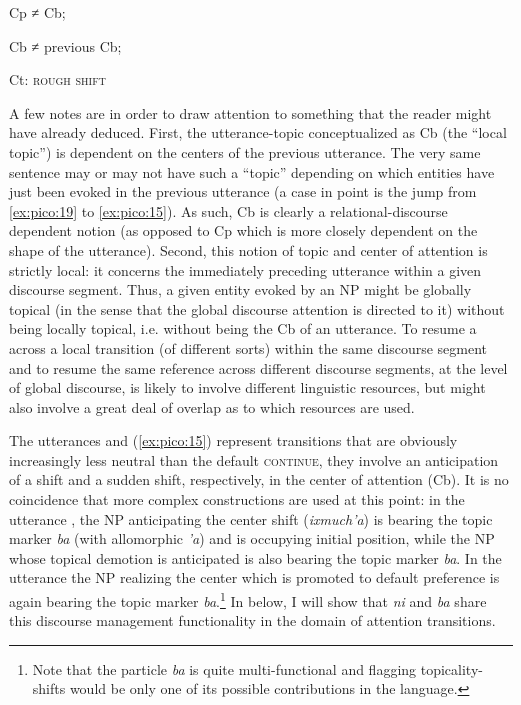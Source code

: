 \documentclass[output=paper
,modfonts
,nonflat]{langsci/langscibook}
\begin{document}
Cp ≠ Cb;

Cb ≠ previous Cb; 

Ct: \textsc{rough shift}
\z 

A few notes are in order to draw attention to something that the reader might have already deduced. First, the utterance-topic conceptualized as Cb (the ``local topic'') is dependent on the centers of the previous utterance. The very same sentence may or may not have such a ``topic'' depending on which entities have just been evoked in the previous utterance (a case in point is the jump from \ref{ex:pico:19} to \ref{ex:pico:15}). As such, Cb is clearly a relational-discourse dependent notion (as opposed to Cp which is more closely dependent on the shape of the utterance).
Second, this notion of topic and center of attention is strictly local: it concerns the immediately preceding utterance within a given discourse segment. Thus, a given entity evoked by an NP might be globally topical (in the sense that the global discourse attention is directed to it) without being locally topical, i.e. without being the Cb of an utterance. To resume a  across a local transition (of different sorts) within the same discourse segment and to resume the same reference across different discourse segments, at the level of global discourse, is likely to involve different linguistic resources, but might also involve a great deal of overlap as to which resources are used.

The utterances  and (\ref{ex:pico:15}) represent transitions that are obviously increasingly less neutral than the default \textsc{continue}, they involve an anticipation of a shift and a sudden shift, respectively, in the center of attention (Cb). 
It is no coincidence that more complex constructions are used at this point: in the utterance , the NP anticipating the center shift (\textit{ixmuch'a}) is bearing the topic marker \textit{ba} (with allomorphic \textit{'a}) and is occupying initial position, while the NP whose topical demotion is anticipated is also bearing the topic marker \textit{ba}. In the utterance  the NP realizing the center which is promoted to default preference is again bearing the topic marker \textit{ba}.\footnote{Note that the particle \textit{ba} is quite multi-functional and flagging topicality-shifts would be only one of its possible contributions in the language.} In  below, I will show that \textit{ni} and \textit{ba} share this discourse management functionality in the domain of attention transitions.
\end{document}
